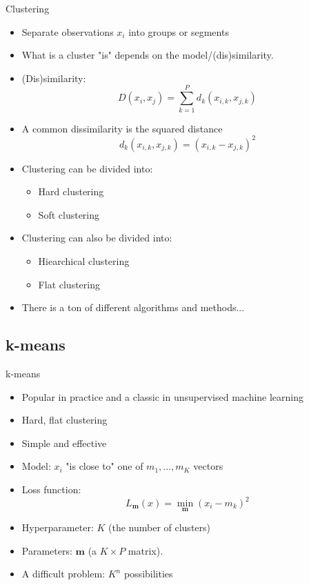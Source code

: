 \documentclass[10pt]{beamer}
\begin{document}
\begin{frame}{Clustering}
\begin{itemize}
\item Separate observations $x_i$ into {\color{uured} groups} or {\color{uured} segments}\pause
\item What is a cluster "is" depends on the {\color{uured} model/(dis)similarity}.
\item (Dis)similarity:
\[
D(x_i, x_j) = \sum_{k = 1}^P d_k(x_{i,k}, x_{j,k})
\]
\item A common dissimilarity is the squared distance
\[
d_k(x_{i,k}, x_{j,k}) = (x_{i,k} - x_{j,k})^2
\]
\pause
\item Clustering can be divided into:
\begin{itemize}
\item {\color{uured} Hard} clustering%
\item {\color{uured} Soft} clustering%
\end{itemize}
\pause
\item Clustering can also be divided into:
\begin{itemize}
\item {\color{uured} Hiearchical} clustering
\item {\color{uured} Flat} clustering
\end{itemize}
\pause
\item There is a ton of different algorithms and methods...
\end{itemize}

\end{frame}

\subsection{k-means}

\begin{frame}{k-means}
\begin{itemize}
\item Popular in practice and a classic in unsupervised machine learning\pause
\item Hard, flat clustering
\item Simple and effective\pause
\item {\color{uured} Model}: $x_i$ "is close to" one of $m_1,...,m_K$ vectors
\item {\color{uured} Loss function}:
\[
L_\mathbf{m} (x) = \min_\mathbf{m} (x_i - m_k)^2
\]
\pause
\item {\color{uured} Hyperparameter}: $K$ (the number of clusters)
\item {\color{uured} Parameters}:  $\mathbf{m}$ (a $K \times P$ matrix).
\pause
\item A {\color{uured} difficult} problem: $K^n$ possibilities
\end{itemize}

\end{frame}
\end{document}
